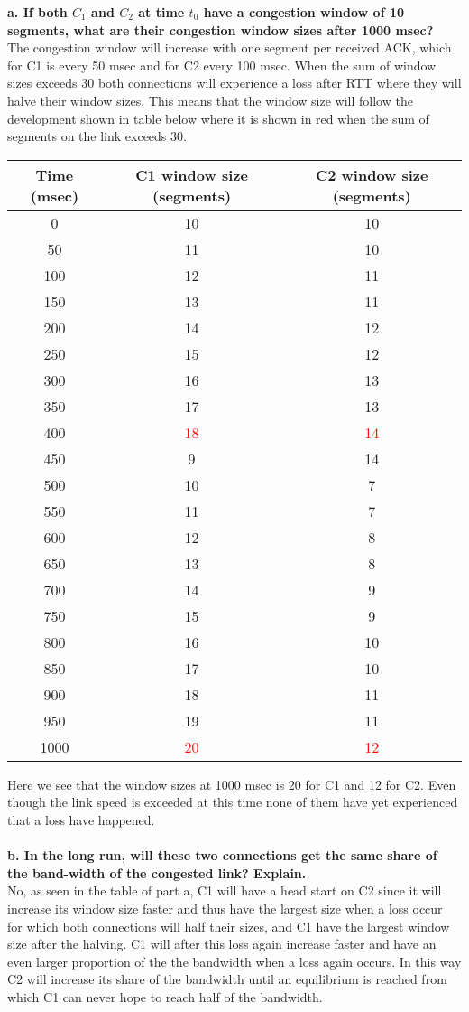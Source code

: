 \textbf{a. If both $C_1$ and $C_2$ at time $t_0$ have a congestion window of 10 segments, what are their congestion window sizes after 1000 msec?} \\
The congestion window will increase with one segment per received ACK, which for C1 is every 50 msec and for C2 every 100 msec. When the sum of window sizes exceeds 30 both connections will experience a loss after RTT where they will halve their window sizes. This means that the window size will follow the development shown in table below where it is shown in red when the sum of segments on the link exceeds 30. \\
\begin{center}
\begin{tabular}{ccc}
  \hline
  Time (msec) & C1 window size (segments) & C2 window size (segments) \\
  \hline
  0 & 10 & 10 \\
  50 & 11 & 10 \\
  100 & 12 & 11 \\
  150 & 13 & 11 \\
  200 & 14 & 12 \\
  250 & 15 & 12 \\
  300 & 16 & 13 \\
  350 & 17 & 13 \\
  400 & \textcolor{red}{18} & \textcolor{red}{14} \\
  450 & 9 & 14 \\
  500 & 10 & 7 \\
  550 & 11 & 7 \\
  600 & 12 & 8 \\
  650 & 13 & 8 \\
  700 & 14 & 9 \\
  750 & 15 & 9 \\
  800 & 16 & 10 \\
  850 & 17 & 10 \\
  900 & 18 & 11 \\
  950 & 19 & 11 \\
  1000 & \textcolor{red}{20} & \textcolor{red}{12} \\
  \hline
\end{tabular}
\end{center}
Here we see that the window sizes at 1000 msec is 20 for C1 and 12 for C2. Even though the link speed is exceeded at this time none of them have yet experienced that a loss have happened. \\
\\
\textbf{b. In the long run, will these two connections get the same share of the band-width of the congested link? Explain.} \\
No, as seen in the table of part a, C1 will have a head start on C2 since it will increase its window size faster and thus have the largest size when a loss occur for which both connections will half their sizes, and C1 have the largest window size after the halving. C1 will after this loss again increase faster and have an even larger proportion of the the bandwidth when a loss again occurs. In this way C2 will increase its share of the bandwidth until an equilibrium is reached from which C1 can never hope to reach half of the bandwidth.


